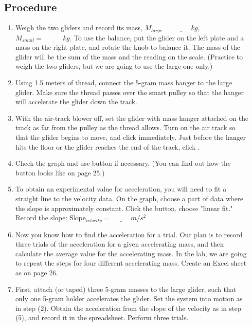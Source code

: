 \documentclass{article}
\begin{document}
\subsection*{Procedure}

\begin{enumerate}
\item Weigh the two gliders and record its mass, $M_{large}=\underline{~~~~~~~~~~~~~}kg$, $M_{small}=\underline{~~~~~~~~~~~~~}kg$. 
To use the balance, put the glider on the left plate and a mass on the right plate, and rotate the knob to balance it. The mass of the glider will be the sum of the mass and the reading on the scale. (Practice to weigh the two gliders, but we are going to use the large one only.)

\item Using 1.5 meters of thread, connect the 5-gram mass hanger to the large glider. Make sure the thread passes over the smart pulley so that the hanger will accelerate the glider down the track.

\item With the air-track blower off, set the glider with mass hanger attached on the track as far from the pulley as the thread allows. Turn on the air track so that the glider begins to move, and click  immediately. Just before the hanger hits the floor or the glider reaches the end of the track, click .

\item Check the graph and use  button if necessary. (You can find out how the button looks like on page 25.)

\item To obtain an experimental value for acceleration, you will need to fit a straight line to the velocity data. On the graph, choose a part of data where the slope is approximately constant. Click the  button, choose "linear fit." Record the slope: Slope$_{velocity}=\underline{~~~~~~~~~~~~~}m/s^2$

\item Now you know how to find the acceleration for a trial. Our plan is to record three trials of the acceleration for a given accelerating mass, and then calculate the average value for the accelerating mass. In the lab, we are going to repeat the steps for four different accelerating mass. Create an Excel sheet as on page 26.
 
\item First, attach (or taped) three 5-gram masses to the large glider, such that only one 5-gram holder accelerates the glider. Set the system into motion as in step (2). Obtain the acceleration from the slope of the velocity as in step (5), and record it in the spreadsheet. Perform three trials. 


\end{enumerate}
\end{document}
